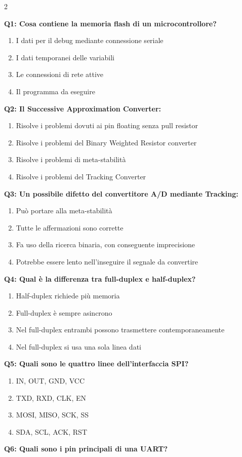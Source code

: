 \documentclass[10pt]{article}
\begin{document}
\begin{multicols}{2}

\textbf{Q1: Cosa contiene la memoria flash di un microcontrollore?}

\begin{enumerate}[label=\arabic*.]
\item I dati per il debug mediante connessione seriale
\item I dati temporanei delle variabili
\item Le connessioni di rete attive
\item Il programma da eseguire
\end{enumerate}
\textbf{Q2: Il Successive Approximation Converter:}

\begin{enumerate}[label=\arabic*.]
\item Risolve i problemi dovuti ai pin floating senza pull resistor
\item Risolve i problemi del Binary Weighted Resistor converter
\item Risolve i problemi di meta-stabilità
\item Risolve i problemi del Tracking Converter
\end{enumerate}
\textbf{Q3: Un possibile difetto del convertitore A/D mediante Tracking:}

\begin{enumerate}[label=\arabic*.]
\item Può portare alla meta-stabilità
\item Tutte le affermazioni sono corrette
\item Fa uso della ricerca binaria, con conseguente imprecisione
\item Potrebbe essere lento nell'inseguire il segnale da convertire
\end{enumerate}
\textbf{Q4: Qual è la differenza tra full-duplex e half-duplex?}

\begin{enumerate}[label=\arabic*.]
\item Half-duplex richiede più memoria
\item Full-duplex è sempre asincrono
\item Nel full-duplex entrambi possono trasmettere contemporaneamente
\item Nel full-duplex si usa una sola linea dati
\end{enumerate}
\textbf{Q5: Quali sono le quattro linee dell’interfaccia SPI?}

\begin{enumerate}[label=\arabic*.]
\item IN, OUT, GND, VCC
\item TXD, RXD, CLK, EN
\item MOSI, MISO, SCK, SS
\item SDA, SCL, ACK, RST
\end{enumerate}
\textbf{Q6: Quali sono i pin principali di una UART?}


\end{multicols}
\end{document}
